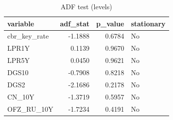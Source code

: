 \begin{table}
\caption{ADF test (levels)}
\label{tab:5_2}
\begin{tabular}{lrrl}
\toprule
variable & adf_stat & p_value & stationary \\
\midrule
cbr_key_rate & -1.1888 & 0.6784 & No \\
LPR1Y & 0.1139 & 0.9670 & No \\
LPR5Y & 0.0450 & 0.9621 & No \\
DGS10 & -0.7908 & 0.8218 & No \\
DGS2 & -2.1686 & 0.2178 & No \\
CN_10Y & -1.3719 & 0.5957 & No \\
OFZ_RU_10Y & -1.7234 & 0.4191 & No \\
\bottomrule
\end{tabular}
\end{table}
